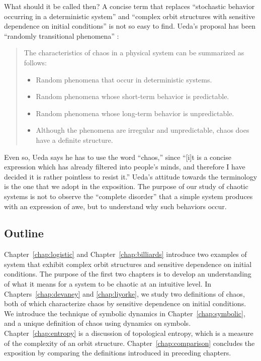 \documentclass[10pt,twoside,draft]{book}
\begin{document}
What should it be called then?
A concise term that replaces ``stochastic behavior occurring in a deterministic system'' and ``complex orbit structures with sensitive dependence on initial conditions'' is not so easy to find.
Ueda's proposal has been ``randomly transitional phenomena'' \citep[p.24]{ueda-abraham}:
\begin{quotation}
  The characteristics of chaos in a physical system can be summarized as follows:
  \begin{itemize}
    \item Random phenomena that occur in deterministic systems.
    \item Random phenomena whose short-term behavior is predictable.
    \item Random phenomena whose long-term behavior is unpredictable.
    \item Although the phenomena are irregular and unpredictable, chaos does have a definite structure.
  \end{itemize}
\end{quotation}
Even so, Ueda says he has to use the word ``chaos,'' since ``[i]t is a concise expression which has already filtered into people's minds, and therefore I have decided it is rather pointless to resist it.''
Ueda's attitude towards the terminology is the one that we adopt in the exposition.
The purpose of our study of chaotic systems is not to observe the ``complete disorder'' that a simple system produces with an expression of awe, but to understand why such behaviors occur.

\subsection*{Outline}
Chapter~\ref{chap:logistic} and Chapter~\ref{chap:billiards} introduce two examples of system that exhibit complex orbit structures and sensitive dependence on initial conditions.
The purpose of the first two chapters is to develop an understanding of what it means for a system to be chaotic at an intuitive level.
In Chapters~\ref{chap:devaney} and \ref{chap:liyorke}, we study two definitions of chaos, both of which characterize chaos by sensitive dependence on initial conditions.
We introduce the technique of symbolic dynamics in Chapter~\ref{chap:symbolic}, and a unique definition of chaos using dynamics on symbols.
Chapter~\ref{chap:entropy} is a discussion of topological entropy, which is a measure of the complexity of an orbit structure. 
Chapter~\ref{chap:comparison} concludes the exposition by comparing the definitions introduced in preceding chapters.
\end{document}
